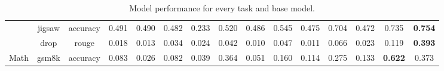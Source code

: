 \begin{table}[]
{\begin{tabular}{ccccccccccccccc}
                                   & jigsaw                         & accuracy                         & 0.491              & 0.490             & 0.482                      & 0.233             & 0.520                      & 0.486               & 0.545                    & 0.475               & 0.704                        & 0.472                   & 0.735                  & \textbf{0.754} \\
                                   & drop                           & rouge                            & 0.018              & 0.013             & 0.034                      & 0.024             & 0.042                      & 0.010               & 0.047                    & 0.011               & 0.066                        & 0.023                   & 0.119                  & \textbf{0.393} \\
Math                               & gsm8k                          & accuracy                         & 0.083              & 0.026             & 0.082                      & 0.039             & 0.364                      & 0.051               & 0.160                    & 0.114               & 0.275                        & 0.133                   & \textbf{0.622}         & 0.373         
\end{tabular}
}

\vspace{10mm}
\caption{Model performance for every task and base model.}

\end{table}